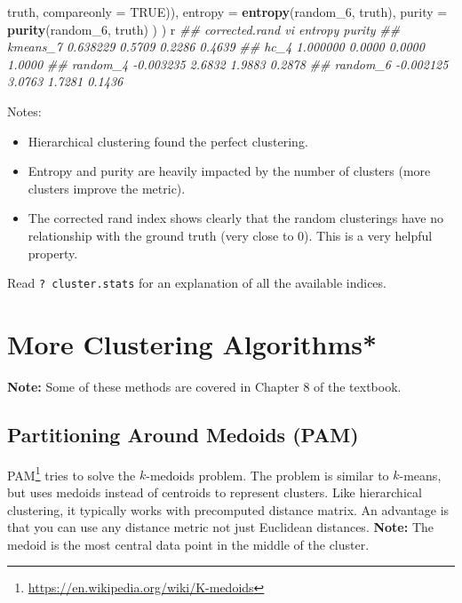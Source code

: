 \documentclass[
  notitlepage]{book}
\newenvironment{Shaded}{\begin{snugshade}}{\end{snugshade}}
\newcommand{\CommentTok}[1]{\textcolor[rgb]{0.56,0.35,0.01}{\textit{#1}}}
\newcommand{\DataTypeTok}[1]{\textcolor[rgb]{0.13,0.29,0.53}{#1}}
\newcommand{\DecValTok}[1]{\textcolor[rgb]{0.00,0.00,0.81}{#1}}
\newcommand{\KeywordTok}[1]{\textcolor[rgb]{0.13,0.29,0.53}{\textbf{#1}}}
\newcommand{\NormalTok}[1]{#1}
\newcommand{\OtherTok}[1]{\textcolor[rgb]{0.56,0.35,0.01}{#1}}
\DeclareRobustCommand{\href}[2]{#2\footnote{\url{#1}}}
\providecommand{\tightlist}{%
  \setlength{\itemsep}{0pt}\setlength{\parskip}{0pt}}
\begin{document}
\begin{Shaded}
\begin{Highlighting}[]
\NormalTok{                              truth, }\DataTypeTok{compareonly =} \OtherTok{TRUE}\NormalTok{)),}
    \DataTypeTok{entropy =} \KeywordTok{entropy}\NormalTok{(random\_}\DecValTok{6}\NormalTok{, truth),}
    \DataTypeTok{purity =} \KeywordTok{purity}\NormalTok{(random\_}\DecValTok{6}\NormalTok{, truth)}
\NormalTok{    )}
\NormalTok{  )}
\NormalTok{r}
\CommentTok{\#\#          corrected.rand     vi entropy purity}
\CommentTok{\#\# kmeans\_7       0.638229 0.5709  0.2286 0.4639}
\CommentTok{\#\# hc\_4           1.000000 0.0000  0.0000 1.0000}
\CommentTok{\#\# random\_4      {-}0.003235 2.6832  1.9883 0.2878}
\CommentTok{\#\# random\_6      {-}0.002125 3.0763  1.7281 0.1436}
\end{Highlighting}
\end{Shaded}

Notes:

\begin{itemize}
\tightlist
\item
  Hierarchical clustering found the perfect clustering.
\item
  Entropy and purity are heavily impacted by the number of clusters
  (more clusters improve the metric).
\item
  The corrected rand index shows clearly that the random clusterings
  have no relationship with the ground truth (very close to 0). This
  is a very helpful property.
\end{itemize}

Read \texttt{?\ cluster.stats} for an explanation of all the available indices.

\hypertarget{more-clustering-algorithms}{%
\section{More Clustering Algorithms*}\label{more-clustering-algorithms}}

\textbf{Note:} Some of these methods are covered in Chapter 8 of the textbook.

\hypertarget{partitioning-around-medoids-pam}{%
\subsection{Partitioning Around Medoids (PAM)}\label{partitioning-around-medoids-pam}}

\href{https://en.wikipedia.org/wiki/K-medoids}{PAM} tries to solve the
\(k\)-medoids problem. The problem is similar to \(k\)-means, but uses
medoids instead of centroids to represent clusters. Like hierarchical
clustering, it typically works with precomputed distance matrix. An
advantage is that you can use any distance metric not just Euclidean
distances. \textbf{Note:} The medoid is the most central data point in the
middle of the cluster.
\end{document}
